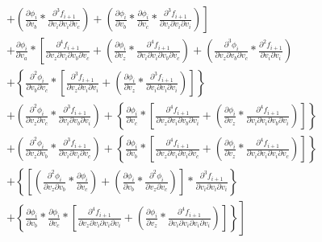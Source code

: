 \documentclass[12pt,letter]{article}
\begin{document}
\begin{equation}
\begin{split}
	\\
	&+
	\left.
	\left(\frac{\partial \phi_i}{\partial v_b} * \frac{\partial^3 f_{i+1}}{\partial v_i \partial v_i \partial v_c}\right) + 
	\left(\frac{\partial \phi_i}{\partial v_b} * \frac{\partial \phi_i}{\partial v_c} * \frac{\partial^3 f_{i+1}}{\partial v_i \partial v_i \partial v_i}\right)\right]
	\\
	&+
	\frac{\partial \phi_i}{\partial v_a} * 
	\left[\frac{\partial^4 f_{i+1}}{\partial v_z \partial v_i \partial v_b \partial v_c} + 
	\left(\frac{\partial \phi_i}{\partial v_z} * \frac{\partial^4 f_{i+1}}{\partial v_i \partial v_i \partial v_b \partial v_c}\right) + 
	\left(\frac{\partial^3 \phi_i}{\partial v_z \partial v_b \partial v_c} * \frac{\partial^2 f_{i+1}}{\partial v_i \partial v_i}\right)
	\right.
	\\
	&+
	\left.
	\left\{\frac{\partial^2 \phi_i}{\partial v_b \partial v_c} * \left[\frac{\partial^3 f_{i+1}}{\partial v_z \partial v_i \partial v_i} +
	\left(\frac{\partial \phi_i}{\partial v_z} * \frac{\partial^3 f_{i+1}}{\partial v_i \partial v_i \partial v_i}\right)\right]\right\}
	\right.
	\\
	&+
	\left.
	\left(\frac{\partial^2 \phi_i}{\partial v_z \partial v_c} * \frac{\partial^3 f_{i+1}}{\partial v_i \partial v_b \partial v_i}\right) + 
	\left\{\frac{\partial \phi_i}{\partial v_c} * \left[\frac{\partial^4 f_{i+1}}{\partial v_z \partial v_i \partial v_b \partial v_i} + \left(\frac{\partial \phi_i}{\partial v_z} * \frac{\partial^4 f_{i+1}}{\partial v_i \partial v_i \partial v_b \partial v_i}\right)\right]\right\}
	\right.
	\\
	&+
	\left.
	\left(\frac{\partial^2 \phi_i}{\partial v_z\partial v_b} * \frac{\partial^3 f_{i+1}}{\partial v_i \partial v_i \partial v_c}\right) + 
	\left\{\frac{\partial \phi_i}{\partial v_b} * \left[\frac{\partial^4 f_{i+1}}{\partial v_z \partial v_i \partial v_i \partial v_c} +
	\left(\frac{\partial \phi_i}{\partial v_z} * \frac{\partial^4 f_{i+1}}{\partial v_i \partial v_i \partial v_i \partial v_c}\right)\right]\right\}
	\right.
	\\
	&+
	\left.
	\left\{\left[\left(\frac{\partial^2 \phi_i}{\partial v_z\partial v_b} * \frac{\partial \phi_i}{\partial v_c}\right) + 
	\left(\frac{\partial \phi_i}{\partial v_b} * \frac{\partial^2 \phi_i}{\partial v_z \partial v_c}\right)\right] * \frac{\partial^3 f_{i+1}}{\partial v_i \partial v_i \partial v_i}\right\}
	\right.
	\\
	&+
	\left.
	\left\{\frac{\partial \phi_i}{\partial v_b} * \frac{\partial \phi_i}{\partial v_c} * \left[\frac{\partial^4 f_{i+1}}{\partial v_z \partial v_i \partial v_i \partial v_i} + 
	\left(\frac{\partial \phi_i}{\partial v_z} * \frac{\partial^4 f_{i+1}}{\partial v_i \partial v_i \partial v_i \partial v_i}\right)\right]\right\}\right]
	\end{split}
	\end{equation}
\end{document}

